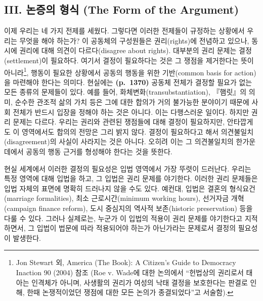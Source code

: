 \documentclass[a4paper,12pt,oneside]{article}  %
\begin{document}
\subsection{III. 논증의 형식 (The Form of the
Argument)}\label{iii.-uxb17cuxc99duxc758-uxd615uxc2dd-the-form-of-the-argument}

이제 우리는 네 가지 전제를 세웠다. 그렇다면 이러한 전제들이 규정하는
상황에서 우리는 무엇을 해야 하는가? 이 공동체의 구성원들은
권리(rights)에 전념하고 있으나, 동시에 권리에 대해 의견이
다르다(disagree about rights). 대부분의 권리 문제는 결정(settlement)이
필요하다. 여기서 결정이 필요하다는 것은 그 쟁점을 제거한다는 뜻이
아니라\footnote{Jon Stewart 외, America (The Book): A Citizen's Guide to
  Democracy Inaction 90 (2004) 참조 (Roe v. Wade에 대한 논의에서
  ``헌법상의 권리로서 태아는 인격체가 아니며, 사생활의 권리가 여성의
  낙태 결정을 보호한다는 판결로 인해, 한때 논쟁적이었던 쟁점에 대한 모든
  논의가 종결되었다''고 서술함).}, 행동이 필요한 상황에서 공동의 행동을
위한 기반(common basis for action)을 마련해야 한다는 의미다. 현실에는
\textbf{(p.~1370)} 공동체 전체가 결정할 필요가 없는 모든 종류의 문제들이
있다. 예를 들어, 화체변화(transubstantiation), 『햄릿』의 의미, 순수한
관조적 삶의 가치 등은 그에 대한 합의가 거의 불가능한 분야이기 때문에
사회 전체가 반드시 입장을 정해야 하는 것은 아니다. 이는 다행스러운
일이다. 하지만 권리 문제는 다르다. 우리는 권리와 관련된 쟁점들에 대해
결정이 필요하지만, 안타깝게도 이 영역에서도 합의의 전망은 그리 밝지
않다. 결정이 필요하다고 해서 의견불일치(disagreement)의 사실이 사라지는
것은 아니다. 오히려 이는 그 의견불일치의 한가운데에서 공동의 행동 근거를
형성해야 한다는 것을 뜻한다.

현실 세계에서 이러한 결정의 필요성은 입법 영역에서 가장 뚜렷이 드러난다.
우리는 특정 영역에 대해 입법을 하고, 그 입법은 권리 문제를 야기한다.
이러한 권리 문제들은 입법 자체의 표면에 명확히 드러나지 않을 수도 있다.
예컨대, 입법은 결혼의 형식요건(marriage formalities), 최소
근로시간(minimum working hours), 선거자금 개혁(campaign finance reform),
도시 중심지의 역사적 보존(historic preservation) 등을 다룰 수 있다.
그러나 실제로는, 누군가 이 입법의 적용이 권리 문제를 야기한다고
지적하면서, 그 입법이 법문에 따라 적용되어야 하는가 아닌가라는 문제로서
결정의 필요성이 발생한다.
\end{document}
